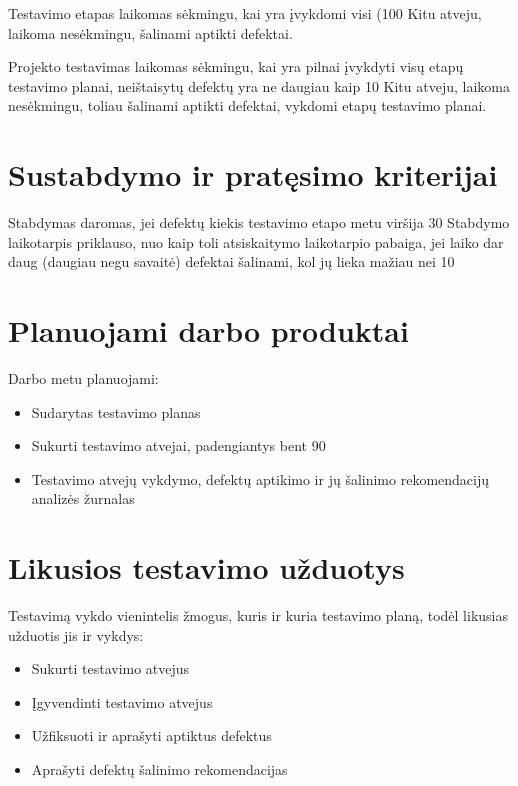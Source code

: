 Testavimo etapas laikomas sėkmingu, kai yra įvykdomi visi (100%
Kitu atveju, laikoma nesėkmingu, šalinami aptikti defektai.

Projekto testavimas laikomas sėkmingu, kai yra pilnai įvykdyti visų etapų testavimo planai, neištaisytų defektų yra ne daugiau kaip 10%
Kitu atveju, laikoma nesėkmingu, toliau šalinami aptikti defektai, vykdomi etapų testavimo planai.

\section{Sustabdymo ir pratęsimo kriterijai}

Stabdymas daromas, jei defektų kiekis testavimo etapo metu viršija 30%
Stabdymo laikotarpis priklauso, nuo kaip toli atsiskaitymo laikotarpio pabaiga, jei laiko dar daug (daugiau negu savaitė) defektai šalinami, kol jų lieka mažiau nei 10%

\section{Planuojami darbo produktai}

Darbo metu planuojami: 

\begin{itemize}
	\item Sudarytas testavimo planas
	\item Sukurti testavimo atvejai, padengiantys bent 90%
	\item Testavimo atvejų vykdymo, defektų aptikimo ir jų šalinimo rekomendacijų analizės žurnalas
\end{itemize}

\section{Likusios testavimo užduotys}

Testavimą vykdo vienintelis žmogus, kuris ir kuria testavimo planą, todėl likusias užduotis jis ir vykdys:

\begin{itemize}
	\item Sukurti testavimo atvejus
	\item Įgyvendinti testavimo atvejus
	\item Užfiksuoti ir aprašyti aptiktus defektus
	\item Aprašyti defektų šalinimo rekomendacijas
\end{itemize}

